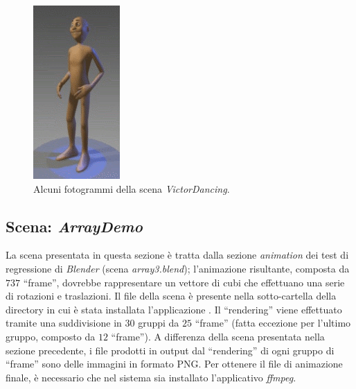 \begin{figure}
\begin{minipage}[t]{0.22\linewidth}
\end{minipage}
\hspace{0.3cm}
\begin{minipage}[t]{0.22\linewidth}
\centering
\includegraphics[scale=0.30]{images/victor-4}
\end{minipage}
\caption{Alcuni fotogrammi della scena \emph{VictorDancing}.}
\label{fig:exec-victor}
\end{figure}

\subsection{Scena: \emph{ArrayDemo}} \label{ssec:exec-arraydemo}

La scena presentata in questa sezione \`e tratta dalla sezione \emph{animation} dei test di regressione di \emph{Blender} (scena \emph{array3.blend}); l'animazione risultante, composta da $737$ ``frame'', dovrebbe rappresentare un vettore di cubi che effettuano una serie di rotazioni e traslazioni.
Il file della scena \`e presente nella sotto-cartella  della directory in cui \`e stata installata l'applicazione \mgTheApp{}.
Il ``rendering'' viene effettuato tramite una suddivisione in $30$ gruppi da $25$ ``frame'' (fatta eccezione per l'ultimo gruppo, composto da $12$ ``frame'').
A differenza della scena presentata nella sezione precedente, i file prodotti in output dal ``rendering'' di ogni gruppo di ``frame'' sono delle immagini in formato PNG.
Per ottenere il file di animazione finale, \`e necessario che nel sistema sia installato l'applicativo \emph{ffmpeg}.

